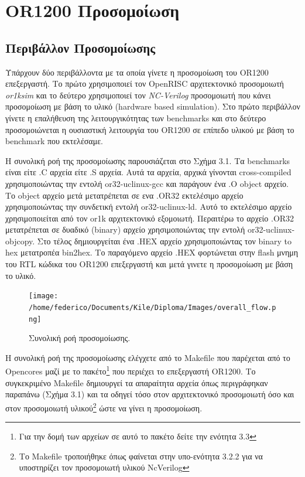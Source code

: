 \documentclass[a4paper,10pt]{article}
\numberwithin{figure}{section}
\numberwithin{table}{section}
\begin{document}
\newpage
\newpage

\section{OR1200 Προσομοίωση}

\subsection{Περιβάλλον Προσομοίωσης}
Υπάρχουν δύο περιβάλλοντα με τα οποία γίνετε η προσομοίωση του OR1200 επεξεργαστή.
Το πρώτο χρησιμοποιεί τον OpenRISC αρχιτεκτονικό προσομοιωτή \emph{or1ksim} και 
το δεύτερο χρησιμοποιεί τον \emph{NC-Verilog} προσομοιωτή που κάνει προσομοίωση με βάση
το υλικό (hardware based simulation). Στο πρώτο περιβάλλον γίνετε η επαλήθευση
της λειτουργικότητας των benchmarks και στο δεύτερο προσομοιώνεται η ουσιαστική
λειτουργία του OR1200 σε επίπεδο υλικού με βάση το benchmark που εκτελέσαμε.\newline


Η συνολική ροή της προσομοίωσης παρουσιάζεται στο Σχήμα 3.1. Τα benchmarks είναι 
είτε .C αρχεία είτε .S αρχεία. Αυτά τα αρχεία, αρχικά γίνονται cross-compiled
 χρησιμοποιώντας την εντολή or32-uclinux-gcc και παράγουν ένα .O object αρχείο. 
Το object αρχείο μετά μετατρέπεται σε ενα .OR32 εκτελέσιμο αρχείο χρησιμοποιώντας
την συνδετική εντολή or32-uclinux-ld. Αυτό το εκτελέσιμο αρχείο χρησιμοποιείται
από τον or1k αρχιτεκτονικό εξομοιωτή. Περαιτέρω το αρχείο .OR32 μετατρέπεται σε
δυαδικό (binary) αρχείο χρησιμοποιώντας την εντολή or32-uclinux-objcopy. Στο τέλος
δημιουργείται ένα .HEX αρχείο χρησιμοποιώντας τον binary to hex μετατροπέα
 bin2hex. Το παραγόμενο αρχείο .HEX φορτώνεται στην flash μνημη του RTL κώδικα
του OR1200 επεξεργαστή και μετά γινετε η προσομοίωση με βάση το υλικό.

\vspace{0.7cm}
\begin{figure}[h!]
 \centering
 \texttt{[image: /home/federico/Documents/Kile/Diploma/Images/overall\_flow.png]}
 \caption{Συνολική ροή προσομοίωσης.}
\end{figure}
\vspace{0.7cm}
\newpage

Η συνολική ροή της προσομοίωσης ελέγχετε από το Makefile που παρέχεται από το Opencores μαζί με το πακέτο\footnote{Για την δομή των αρχείων σε αυτό το πακέτο δείτε την ενότητα 3.3} που περιέχει το επεξεργαστή OR1200. Το συγκεκριμένο Makefile δημιουργεί τα απαραίτητα αρχεία όπως περιγράφηκαν παραπάνω (Σχήμα 3.1) και τα οδηγεί τόσο στον αρχιτεκτονικό προσομοιωτή όσο και στον προσομοιωτή υλικού\footnote{Το Makefile τροποιήθηκε όπως φαίνεται στην υπο-ενότητα 3.2.2 για να υποστηρίζει τον προσομοιωτή υλικού NcVerilog} ώστε να γίνει η προσομοίωση. 
\end{document}
